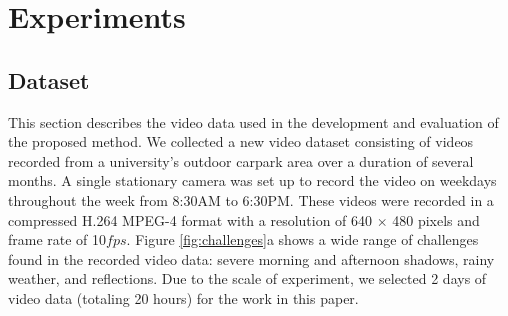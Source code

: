 \documentclass[runningheads]{llncs}
\begin{document}

 \section{Experiments}

 \subsection{Dataset}
 \label{sec:dataset}
This section describes the video data used in the development and evaluation of the proposed method. We collected a new video dataset consisting of videos recorded from a university's outdoor carpark area over a duration of several months. A single stationary camera was set up 
to record the video on weekdays throughout the week from 8:30AM to 6:30PM.
These videos were recorded in a compressed H.264 MPEG-4 format with a resolution of 640 $\times$ 480 pixels and frame rate of 10$fps$.  %
Figure \ref{fig:challenges}a shows a wide range of challenges found in the recorded video data: severe morning and afternoon shadows, rainy weather, and reflections. Due to the scale of experiment, we selected 2 days of video data (totaling 20 hours)
for the work in this paper.
\end{document}
